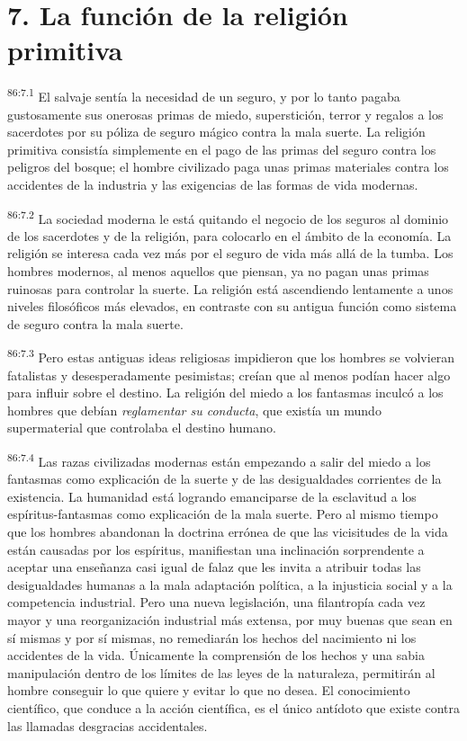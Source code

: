 \documentclass[twoside, 11pt]{book}
\begin{document}
\section*{7. La función de la religión primitiva}
\par
\textsuperscript{86:7.1} El salvaje sentía la necesidad de un seguro, y por lo tanto pagaba gustosamente sus onerosas primas de miedo, superstición, terror y regalos a los sacerdotes por su póliza de seguro mágico contra la mala suerte. La religión primitiva consistía simplemente en el pago de las primas del seguro contra los peligros del bosque; el hombre civilizado paga unas primas materiales contra los accidentes de la industria y las exigencias de las formas de vida modernas.

\par
\textsuperscript{86:7.2} La sociedad moderna le está quitando el negocio de los seguros al dominio de los sacerdotes y de la religión, para colocarlo en el ámbito de la economía. La religión se interesa cada vez más por el seguro de vida más allá de la tumba. Los hombres modernos, al menos aquellos que piensan, ya no pagan unas primas ruinosas para controlar la suerte. La religión está ascendiendo lentamente a unos niveles filosóficos más elevados, en contraste con su antigua función como sistema de seguro contra la mala suerte.

\par
\textsuperscript{86:7.3} Pero estas antiguas ideas religiosas impidieron que los hombres se volvieran fatalistas y desesperadamente pesimistas; creían que al menos podían hacer algo para influir sobre el destino. La religión del miedo a los fantasmas inculcó a los hombres que debían \textit{reglamentar su conducta}, que existía un mundo supermaterial que controlaba el destino humano.

\par
\textsuperscript{86:7.4} Las razas civilizadas modernas están empezando a salir del miedo a los fantasmas como explicación de la suerte y de las desigualdades corrientes de la existencia. La humanidad está logrando emanciparse de la esclavitud a los espíritus-fantasmas como explicación de la mala suerte. Pero al mismo tiempo que los hombres abandonan la doctrina errónea de que las vicisitudes de la vida están causadas por los espíritus, manifiestan una inclinación sorprendente a aceptar una enseñanza casi igual de falaz que les invita a atribuir todas las desigualdades humanas a la mala adaptación política, a la injusticia social y a la competencia industrial. Pero una nueva legislación, una filantropía cada vez mayor y una reorganización industrial más extensa, por muy buenas que sean en sí mismas y por sí mismas, no remediarán los hechos del nacimiento ni los accidentes de la vida. Únicamente la comprensión de los hechos y una sabia manipulación dentro de los límites de las leyes de la naturaleza, permitirán al hombre conseguir lo que quiere y evitar lo que no desea. El conocimiento científico, que conduce a la acción científica, es el único antídoto que existe contra las llamadas desgracias accidentales.
\end{document}
